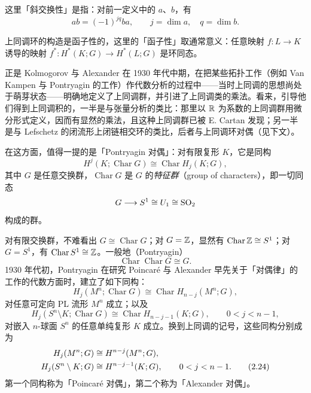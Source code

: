 这里「斜交换性」是指：对前一定义中的 $a$、$b$，有
\begin{equation}
  ab=(-1)^{jq}ba,\qquad j=\dim a,\quad q=\dim b. \tag{2.23}
\end{equation}

上同调环的构造是函子性的，这里的「函子性」取通常意义：任意映射 $f: L\to K$ 诱导的映射 $f^*: H^*(K;G)\to H^*(L;G)$ 是环同态。

正是 Kolmogorov 与 Alexander 在 1930 年代中期，在把某些拓扑工作（例如 Van Kampen 与 Pontryagin 的工作）作代数分析的过程中——当时上同调的思想尚处于萌芽状态——明确地定义了上同调群，并引进了上同调类的乘法。看来，引导他们得到上同调积的，一半是与张量分析的类比：那里以 $\mathbb{R}$ 为系数的上同调群用微分形式定义，因而有显然的乘法，且这种上同调群已被 E. Cartan 发现；另一半是与 Lefschetz 的闭流形上闭链相交环的类比，后者与上同调环对偶（见下文）。

在这方面，值得一提的是「Pontryagin 对偶」：对有限复形 $K$，它是同构
\[
  H^j(K;\operatorname{Char}G)\cong \operatorname{Char}H_j(K;G),
\]
其中 $G$ 是任意交换群，$\operatorname{Char}G$ 是 $G$ 的\emph{特征群}（group of characters），即一切同态
\[
  G\longrightarrow S^1\cong U_1\cong \mathrm{SO}_2
\]
构成的群。

对有限交换群，不难看出 $G\cong\operatorname{Char}G$；对 $G=\mathbb{Z}$，显然有 $\operatorname{Char}\mathbb{Z}\cong S^1$；对 $G=S^1$，有 $\operatorname{Char}S^1\cong\mathbb{Z}$。一般地（Pontryagin）
\[
  \operatorname{Char}\operatorname{Char}G\cong G.
\]
1930 年代初，Pontryagin 在研究 Poincaré 与 Alexander 早先关于「对偶律」的工作的代数方面时，建立了如下同构：
\[
  H_j(M^n;\operatorname{Char}G)\cong \operatorname{Char}H_{n-j}(M^n;G),
\]
对任意可定向 PL 流形 $M^n$ 成立；以及
\[
  H_j(S^n\setminus K;\operatorname{Char}G)\cong \operatorname{Char}H_{n-j-1}(K;G),
  \qquad 0<j<n-1,
\]
对嵌入 $n$-球面 $S^n$ 的任意单纯复形 $K$ 成立。换到上同调的记号，这些同构分别成为
\begin{align}
  H_j(M^n;G) &\cong H^{n-j}(M^n;G),\notag\\
  H_j(S^n\setminus K;G) &\cong H^{n-j-1}(K;G),
  \qquad 0<j<n-1. \tag{2.24}
\end{align}
第一个同构称为「Poincaré 对偶」，第二个称为「Alexander 对偶」。

